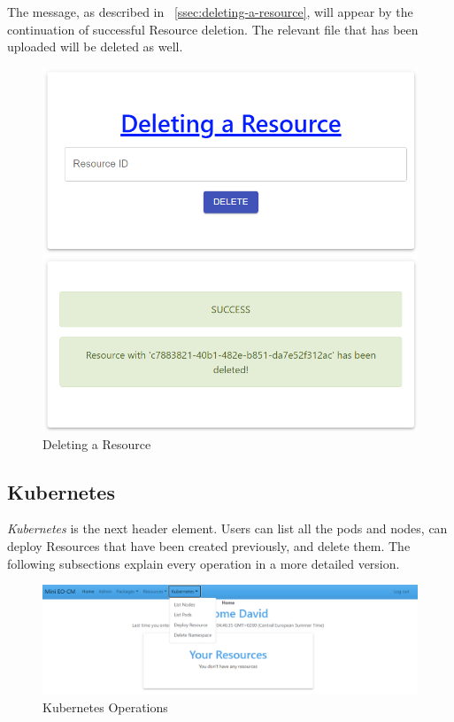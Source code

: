 The message, as described in ~\autoref{ssec:deleting-a-resource}, will appear by the continuation of successful Resource deletion. The relevant file that has been uploaded will be deleted as well.
\begin{figure}[H]
	\centering
	\includegraphics[width=140mm]{images/delete-resource-2.png}
	\caption{Deleting a Resource}
	\label{ssec:deleting-a-resource}
\end{figure}

\subsection{Kubernetes}
\emph{Kubernetes} is the next header element. Users can list all the pods and nodes, can deploy Resources that have been created previously, and delete them. The following subsections explain every operation in a more detailed version.

\begin{figure}[H]
	\centering
	\includegraphics[width=140mm]{images/kubernetes-operations.png}
	\caption{Kubernetes Operations}
	\label{ssec:kubernetes-operations}
\end{figure}

